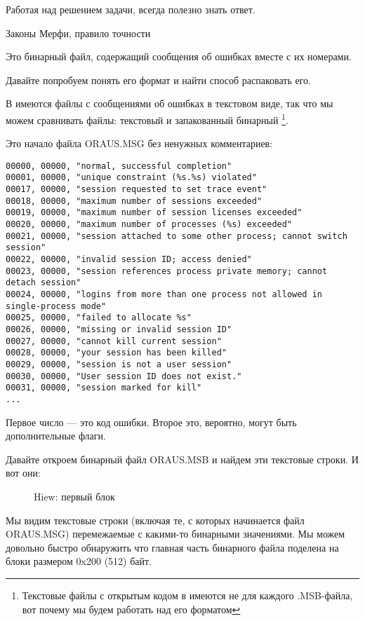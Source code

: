 ﻿
\myindex{\oracle}

\epigraph{Работая над решением задачи, всегда полезно знать ответ.}{Законы Мерфи, правило точности}

Это бинарный файл, содержащий сообщения об ошибках вместе с их номерами.

Давайте попробуем понять его формат и найти способ распаковать его.

В \oracle имеются файлы с сообщениями об ошибках в текстовом виде, так что мы можем сравнивать файлы:
текстовый и запакованный бинарный
\footnote{Текстовые файлы с открытым кодом в \oracle имеются не для каждого .MSB-файла, вот почему мы будем работать над его форматом}.

Это начало файла ORAUS.MSG без ненужных комментариев:

\begin{lstlisting}[caption=Начало файла ORAUS.MSG без комментариев]
00000, 00000, "normal, successful completion"
00001, 00000, "unique constraint (%s.%s) violated"
00017, 00000, "session requested to set trace event"
00018, 00000, "maximum number of sessions exceeded"
00019, 00000, "maximum number of session licenses exceeded"
00020, 00000, "maximum number of processes (%s) exceeded"
00021, 00000, "session attached to some other process; cannot switch session"
00022, 00000, "invalid session ID; access denied"
00023, 00000, "session references process private memory; cannot detach session"
00024, 00000, "logins from more than one process not allowed in single-process mode"
00025, 00000, "failed to allocate %s"
00026, 00000, "missing or invalid session ID"
00027, 00000, "cannot kill current session"
00028, 00000, "your session has been killed"
00029, 00000, "session is not a user session"
00030, 00000, "User session ID does not exist."
00031, 00000, "session marked for kill"
...
\end{lstlisting}

Первое число --- это код ошибки.
Второе это, вероятно, могут быть дополнительные флаги.

\clearpage
Давайте откроем бинарный файл ORAUS.MSB и найдем эти текстовые строки. 
И вот они:

\begin{figure}[H]
\centering
{}
\caption{Hiew: первый блок}
\label{fig:oracle_MSB_1}
\end{figure}

Мы видим текстовые строки (включая те, с которых начинается файл ORAUS.MSG) перемежаемые с какими-то
бинарными значениями.
Мы можем довольно быстро обнаружить что главная часть бинарного файла поделена на блоки размером 0x200 (512) байт.

